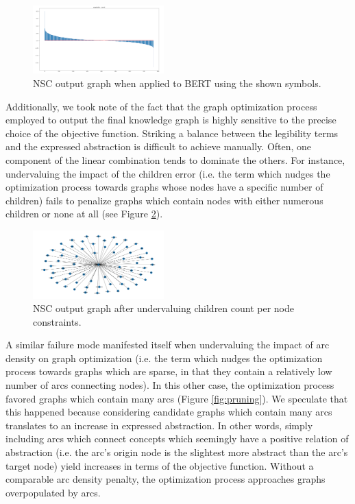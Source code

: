 \begin{figure}[h]
    \centering
    \includegraphics[width=0.45\textwidth]{img/spectrum.png}
    \caption{NSC output graph when applied to BERT using the shown symbols.}\label{fig:spectrum}
\end{figure}

Additionally, we took note of the fact that the graph optimization process employed to output the final knowledge graph is highly sensitive to the precise choice of the objective function. Striking a balance between the legibility terms and the expressed abstraction is difficult to achieve manually. Often, one component of the linear combination tends to dominate the others. For instance, undervaluing the impact of the children error (i.e. the term which nudges the optimization process towards graphs whose nodes have a specific number of children) fails to penalize graphs which contain nodes with either numerous children or none at all (see Figure \ref{fig:children}).

\begin{figure}[h]
    \centering
    \includegraphics[width=0.45\textwidth]{img/too_much_pruning.png}
    \caption{NSC output graph after undervaluing children count per node constraints.}\label{fig:children}
\end{figure}

A similar failure mode manifested itself when undervaluing the impact of arc density on graph optimization (i.e. the term which nudges the optimization process towards graphs which are sparse, in that they contain a relatively low number of arcs connecting nodes). In this other case, the optimization process favored graphs which contain many arcs (Figure \ref{fig:pruning}). We speculate that this happened because considering candidate graphs which contain many arcs translates to an increase in expressed abstraction. In other words, simply including arcs which connect concepts which seemingly have a positive relation of abstraction (i.e. the arc's origin node is the slightest more abstract than the arc's target node) yield increases in terms of the objective function. Without a comparable arc density penalty, the optimization process approaches graphs overpopulated by arcs.

